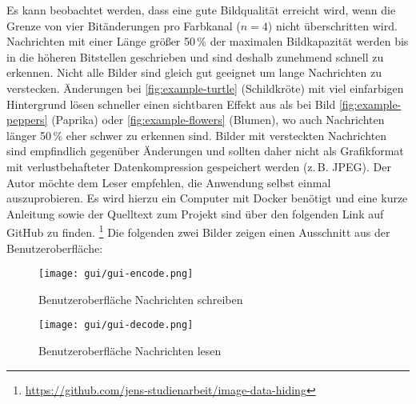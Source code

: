 \newpage



\newpage



\newpage



\newpage

\noindent
Es kann beobachtet werden, dass
eine gute Bildqualität erreicht wird,
wenn die Grenze von vier Bitänderungen pro Farbkanal ($n = 4$) nicht überschritten wird.
Nachrichten mit einer Länge größer 50\,\% der maximalen Bildkapazität werden bis in die höheren
Bitstellen geschrieben und sind deshalb zunehmend schnell zu erkennen.
Nicht alle Bilder sind gleich gut geeignet um lange Nachrichten zu verstecken.
Änderungen bei \ref{fig:example-turtle} (Schildkröte) mit viel einfarbigen Hintergrund
lösen schneller einen sichtbaren Effekt aus als bei Bild \ref{fig:example-peppers}
(Paprika) oder \ref{fig:example-flowers} (Blumen), wo auch Nachrichten länger
50\,\% eher schwer zu erkennen sind. Bilder mit versteckten Nachrichten
sind empfindlich gegenüber Änderungen und sollten daher nicht als
Grafikformat mit verlustbehafteter Datenkompression gespeichert werden (z.\,B. JPEG).
Der Autor möchte dem Leser empfehlen, die Anwendung selbst einmal auszuprobieren.
Es wird hierzu ein Computer mit Docker benötigt und eine kurze Anleitung
sowie der Quelltext zum Projekt sind über den folgenden Link auf GitHub zu finden.
\footnote{\url{https://github.com/jens-studienarbeit/image-data-hiding}}
Die folgenden zwei Bilder zeigen einen
Ausschnitt aus der Benutzeroberfläche:

\begin{figure}
  \centering
  \texttt{[image: gui/gui-encode.png]}
  \caption{Benutzeroberfläche Nachrichten schreiben}
  \label{fig-gui-encode}
\end{figure}

\begin{figure}
  \centering
  \texttt{[image: gui/gui-decode.png]}
  \caption{Benutzeroberfläche Nachrichten lesen}
  \label{fig-gui-decode}
\end{figure}